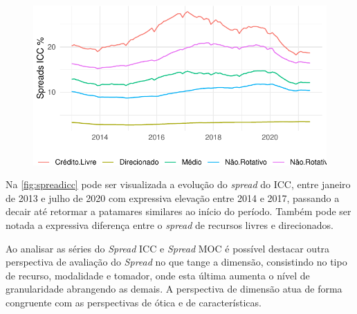 \documentclass[12pt,12pt,openright,oneside,a4paper,chapter=TITLE,section=TITLE,subsection=TITLE,subsubsection=TITLE,english,french,spanish,portugues,sumario=tradicional]{abntex2}
\begin{document}
\begin{figure}

\begin{center}\includegraphics{12-exportedfigures/spread 2019 icc-1} \end{center}
\label{fig:spreadicc}
\end{figure}

Na \autoref{fig:spreadicc} pode ser visualizada a evolução do \emph{spread} do ICC,
entre janeiro de 2013 e julho de 2020 com expressiva elevação entre 2014 e
2017, passando a decair até retormar a patamares similares ao início do
período. Também pode ser notada a expressiva diferença entre o \emph{spread} de
recursos livres e direcionados.

Ao analisar as séries do \emph{Spread} ICC e \emph{Spread} MOC é possível destacar outra perspectiva de avaliação do \emph{Spread} no que tange a dimensão, consistindo no tipo de recurso, modalidade e tomador, onde esta última aumenta o nível de granularidade abrangendo as demais. A perspectiva de dimensão atua de forma congruente com as perspectivas de ótica e de características.
\end{document}
